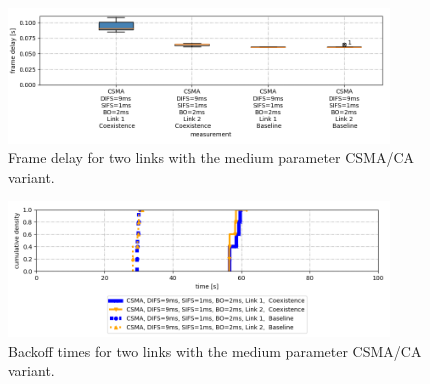 \begin{figure}[tb]
	\label{fig:results-csma-med-dbl-frame-delay}
	\begin{center}
		\includegraphics[width=0.9\textwidth]{pictures/results/same_combinations/csma_med_params/frame_delay_boxplot}
	\end{center}
	\caption{Frame delay for two links with the medium parameter CSMA/CA variant.}
\end{figure}

\begin{figure}[tb]
	\label{fig:results-csma-med-dbl-backoff}
	\begin{center}
		\includegraphics[width=0.9\textwidth]{pictures/results/same_combinations/csma_med_params/backoff_(joint)_sum_cdf}
	\end{center}
	\caption{Backoff times for two links with the medium parameter CSMA/CA variant.}
\end{figure}

